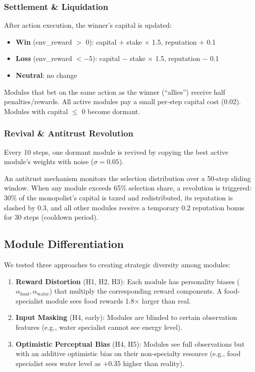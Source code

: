 \documentclass[a4paper,11pt]{article}
\begin{document}
\subsubsection{Settlement \& Liquidation}

After action execution, the winner's capital is updated:
\begin{itemize}[itemsep=2pt]
    \item \textbf{Win} (env\_reward $>$ 0): capital $+$ stake $\times$ 1.5, reputation $+$ 0.1
    \item \textbf{Loss} (env\_reward $< -5$): capital $-$ stake $\times$ 1.5, reputation $-$ 0.1
    \item \textbf{Neutral}: no change
\end{itemize}
Modules that bet on the same action as the winner (``allies'') receive half penalties/rewards. All active modules pay a small per-step capital cost (0.02). Modules with capital $\le$ 0 become dormant.

\subsubsection{Revival \& Antitrust Revolution}

Every 10 steps, one dormant module is revived by copying the best active module's weights with noise ($\sigma=0.05$).

An antitrust mechanism monitors the selection distribution over a 50-step sliding window. When any module exceeds 65\% selection share, a revolution is triggered: 30\% of the monopolist's capital is taxed and redistributed, its reputation is slashed by 0.3, and all other modules receive a temporary 0.2 reputation bonus for 30 steps (cooldown period).

\subsection{Module Differentiation}

We tested three approaches to creating strategic diversity among modules:

\begin{enumerate}[itemsep=2pt]
    \item \textbf{Reward Distortion} (H1, H2, H3): Each module has personality biases ($\alpha_{\text{food}}, \alpha_{\text{water}}$) that multiply the corresponding reward components. A food-specialist module sees food rewards 1.8$\times$ larger than real.
    \item \textbf{Input Masking} (H4, early): Modules are blinded to certain observation features (e.g., water specialist cannot see energy level).
    \item \textbf{Optimistic Perceptual Bias} (H4, H5): Modules see full observations but with an additive optimistic bias on their non-specialty resource (e.g., food specialist sees water level as +0.35 higher than reality).
\end{enumerate}
\end{document}

